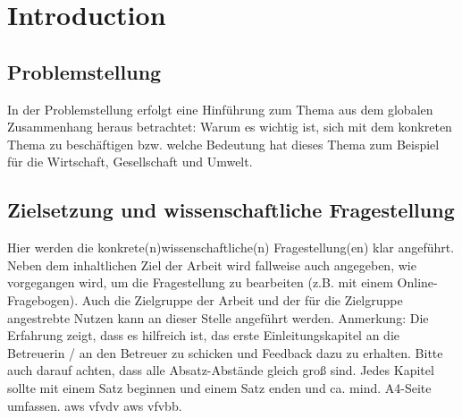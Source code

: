 \chapter{Introduction}

\section{Problemstellung}
In der Problemstellung erfolgt eine Hinführung zum Thema aus dem globalen Zusammenhang heraus betrachtet: Warum es wichtig ist, sich mit dem konkreten Thema zu beschäftigen bzw. welche Bedeutung hat dieses Thema zum Beispiel für die Wirtschaft, Gesellschaft und Umwelt.

\section{Zielsetzung und wissenschaftliche Fragestellung}
Hier werden die konkrete(n)wissenschaftliche(n) Fragestellung(en) klar angeführt. Neben dem inhaltlichen Ziel der Arbeit wird fallweise auch angegeben, wie vorgegangen wird, um die Fragestellung zu bearbeiten (z.B. mit einem Online-Fragebogen). Auch die Zielgruppe der Arbeit und der für die Zielgruppe angestrebte Nutzen kann an dieser Stelle angeführt werden.
Anmerkung: 
Die Erfahrung zeigt, dass es hilfreich ist, das erste Einleitungskapitel an die Betreuerin / an den Betreuer zu schicken und Feedback dazu zu erhalten.
Bitte auch darauf achten, dass alle Absatz-Abstände gleich groß sind.
Jedes Kapitel sollte mit einem Satz beginnen und einem Satz enden und ca. mind.  A4-Seite umfassen.
\ac{aws} vfvdv \ac{aws} vfvbb.



